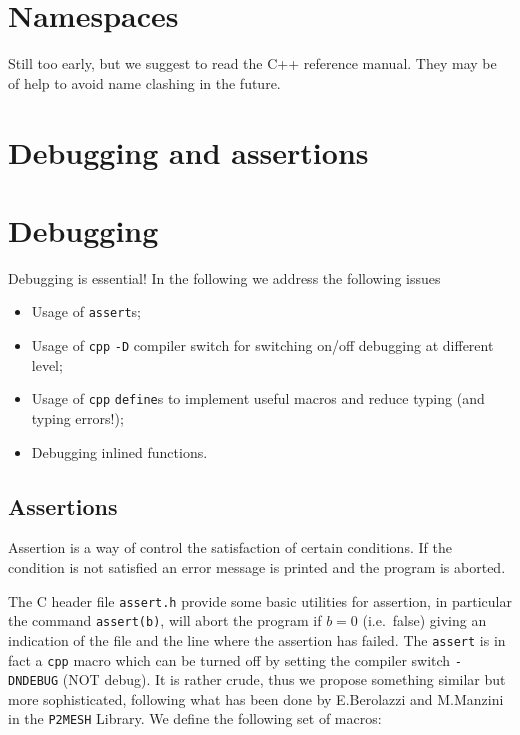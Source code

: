 \section{Namespaces}
%
Still too early, but we suggest to read the C++ reference manual. They
may be of help to avoid name clashing in the future.
%
%
\section{Debugging and assertions} 
% 
\section{Debugging}
Debugging is essential! 
In the following we address the following issues
\begin{itemize}
\item Usage of \texttt{assert}s;
\item Usage of \texttt{cpp}  \texttt{-D} compiler switch for
switching on/off debugging at different level;
\item Usage of \texttt{cpp} \texttt{define}s to implement useful
macros and reduce typing (and typing errors!);
\item Debugging inlined functions.
\end{itemize}
\subsection{Assertions}
Assertion is a way of control the satisfaction of certain conditions.
If the condition is not satisfied an error message is printed and the
program is aborted.  

The C header file \texttt{assert.h} provide some basic utilities for
assertion, in particular the command \texttt{assert(b)}, will abort
the program if $b=0$ (i.e.\  false) giving an indication of the file and
the line where the assertion has failed. The \texttt{assert} is in
fact a \texttt{cpp} macro which can be turned off by setting the
compiler switch \texttt{-DNDEBUG} (NOT debug). It is rather crude,
thus we propose something similar but more sophisticated, following what
has been done by E.Berolazzi and M.Manzini in the \texttt{P2MESH} Library.
We define the following set of macros:

